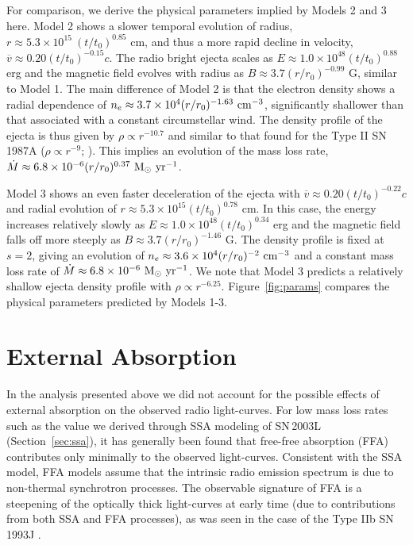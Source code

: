 \documentclass[12pt,preprint]{aastex}
\begin{document}
For comparison, we derive the physical parameters implied by Models 2
and 3 here.  Model 2 shows a slower temporal evolution of radius,
$r\approx 5.3\times 10^{15}~(t/t_0)^{0.85}$ cm, and thus a more rapid
decline in velocity, $\overline{v}\approx 0.20 (t/t_0)^{-0.15} c$.
The radio bright ejecta scales as $E\approx 1.0\times 10^{48}
(t/t_0)^{0.88}$ erg and the magnetic field evolves with radius as
$B\approx 3.7 (r/r_0)^{-0.99}$ G, similar to Model 1.  The main
difference of Model 2 is that the electron density shows a radial
dependence of $n_e\approx 3.7 \times 10^4 (r/r_0)^{-1.63}~\rm
cm^{-3}$, significantly shallower than that associated with a constant
circumstellar wind.  The density profile of the
ejecta is thus given by $\rho \propto r^{-10.7}$ and similar to that
found for the Type II SN\,1987A ($\rho \propto r^{-9}$;
\citealt{a88}). This implies an evolution of the mass loss rate, 
$\dot{M}\approx 6.8\times 10^{-6} (r/r_0)^{0.37}~\rm
M_{\odot}~yr^{-1}$.

Model 3 shows an even faster deceleration of the ejecta with
$\overline{v}\approx 0.20 (t/t_0)^{-0.22} c$ and radial evolution of
$r\approx 5.3\times 10^{15} (t/t_0)^{0.78}$ cm.  In this case, the
energy increases relatively slowly as $E\approx 1.0\times 10^{48}
(t/t_0)^{0.34}$ erg and the magnetic field falls off more steeply as
$B\approx 3.7 (r/r_0)^{-1.46}$ G.  The density profile is fixed at
$s=2$, giving an evolution of $n_e \approx 3.6 \times 10^4
(r/r_0)^{-2}~\rm cm^{-3}$ and a constant mass loss rate of
$\dot{M}\approx 6.8 \times 10^{-6}~\rm M_{\odot}~yr^{-1}$.  We note
that Model 3 predicts a relatively shallow ejecta density profile with
$\rho \propto r^{-6.25}$.  Figure~\ref{fig:params} compares the
physical parameters predicted by Models 1-3.

\section{External Absorption}
\label{sec:ffa}

In the analysis presented above we did not account for the possible effects of
external absorption on the observed radio light-curves.  For
low mass loss rates such as the value we derived through SSA modeling
of SN\,2003L (Section~\ref{sec:ssa}), it has generally been found that
free-free absorption (FFA) contributes only minimally to the observed
light-curves.  Consistent with the SSA model, FFA models assume that the
intrinsic radio emission spectrum is due to non-thermal synchrotron
processes.  The observable signature of FFA is a steepening of the
optically thick light-curves at early time (due to contributions from
both SSA and FFA processes), as was seen in the case of the Type IIb
SN\,1993J \citep{fb98}.  
\end{document}
